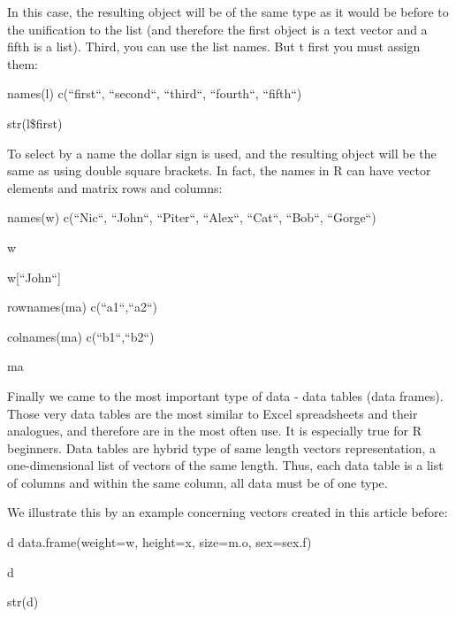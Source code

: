 \documentclass{beamer}
\begin{document}
\begin{frame}{}

In this case, the resulting object will be of the same type as it would be before to the unification to the list (and therefore the first object is a text vector and a fifth is a list). Third, you can use the list names. But t first you must assign them:
\begin{center}

names(l) \leftarrow c(``first``, ``second``, ``third``, ``fourth``, ``fifth``)

str(l\$first)

\end{center}
\end{frame}


\begin{frame}{}


To select by a name the dollar sign is used, and the resulting object will be the same as using double square brackets. In fact, the names in R can have vector elements and matrix rows and columns:

\begin{center}

names(w) \leftarrow c(``Nic``, ``John``, ``Piter``, ``Alex``, ``Cat``, ``Bob``, ``Gorge``)

w

w[``John``]

rownames(ma) \leftarrow c(``a1``,``a2``)

colnames(ma) \leftarrow c(``b1``,``b2``)

ma
\end{center}

\end{frame}


\begin{frame}{}
Finally we came to the most important type of data - data tables (data frames). Those very data tables are the most similar to Excel spreadsheets and their analogues, and therefore are in the most often use. It is especially true for R beginners. Data tables are hybrid type of same length vectors representation, a one-dimensional list of vectors of the same length. Thus, each data table is a list of columns and within the same column, all data must be of one type.
\begin{center}

\end{center}
\end{frame}


\begin{frame}{}
We illustrate this by an example concerning vectors created in this article before:

\begin{center}

d \leftarrow data.frame(weight=w, height=x, size=m.o, sex=sex.f)

d

str(d)


\end{center}
\end{frame}
\end{document}
